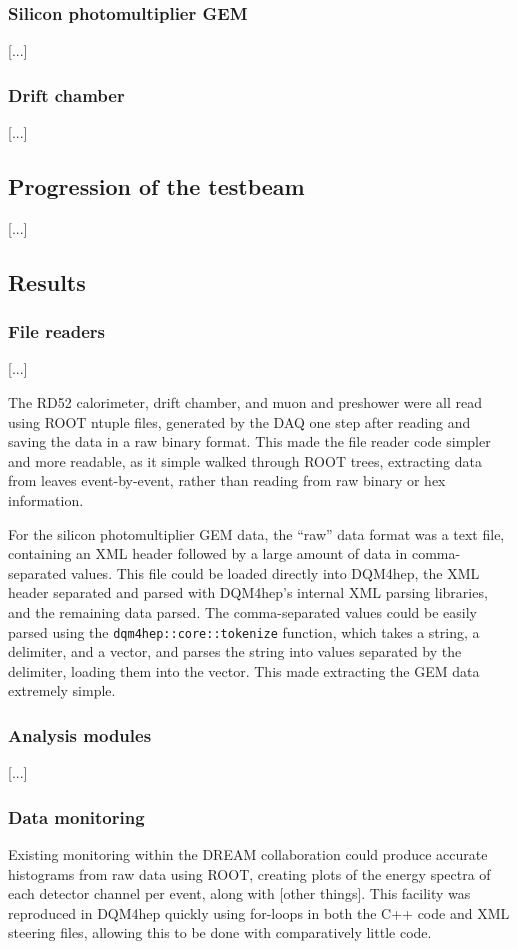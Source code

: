 \subsubsection{Silicon photomultiplier GEM}
[...]

\subsubsection{Drift chamber}
[...]

\subsection{Progression of the testbeam} %
[...]

\subsection{Results}

\subsubsection{File readers}
[...]

The RD52 calorimeter, drift chamber, and muon and preshower were all read using ROOT ntuple files, generated by the DAQ one step after reading and saving the data in a raw binary format. This made the file reader code simpler and more readable, as it simple walked through ROOT trees, extracting data from leaves event-by-event, rather than reading from raw binary or hex information.

For the silicon photomultiplier GEM data, the ``raw'' data format was a text file, containing an XML header followed by a large amount of data in comma-separated values. This file could be loaded directly into DQM4hep, the XML header separated and parsed with DQM4hep's internal XML parsing libraries, and the remaining data parsed. The comma-separated values could be easily parsed using the \texttt{dqm4hep::core::tokenize} function, which takes a string, a delimiter, and a vector, and parses the string into values separated by the delimiter, loading them into the vector. This made extracting the GEM data extremely simple.

\subsubsection{Analysis modules}
[...]

\subsubsection{Data monitoring}
Existing monitoring within the DREAM collaboration could produce accurate histograms from raw data using ROOT, creating plots of the energy spectra of each detector channel per event, along with [other things]. This facility was reproduced in DQM4hep quickly using for-loops in both the C++ code and XML steering files, allowing this to be done with comparatively little code.

